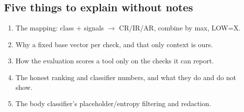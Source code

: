 \subsection{Five things to explain without notes}
\begin{enumerate}[leftmargin=*]
\item The mapping: class + signals $\rightarrow$ CR/IR/AR, combine by max, LOW=X.
\item Why a fixed base vector per check, and that only context is ours.
\item How the evaluation scores a tool only on the checks it can report.
\item The honest ranking and classifier numbers, and what they do and do not show.
\item The body classifier's placeholder/entropy filtering and redaction.
\end{enumerate}



